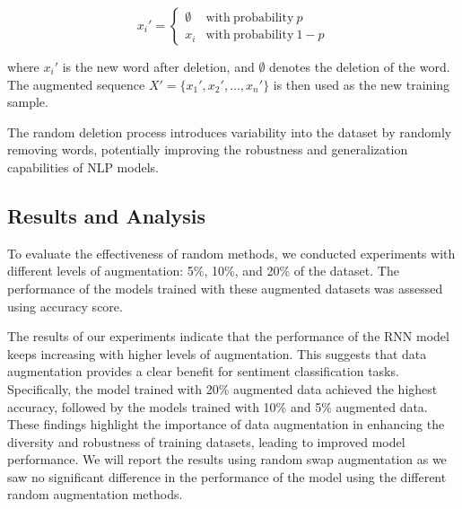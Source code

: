 \documentclass{article}
\begin{document}
\[
  x_i' =
  \begin{cases}
    \emptyset & \mathrm{with\ probability\ } p \\
    x_i & \mathrm{with\ probability\ } 1 - p
  \end{cases}
\]

where \( x_i' \) is the new word after deletion, and \( \emptyset \) denotes the deletion of the word. The augmented sequence \( X' = \{x_1', x_2', \ldots, x_n'\} \) is then used as the new training sample.

The random deletion process introduces variability into the dataset by randomly removing words, potentially improving the robustness and generalization capabilities of NLP models.


\subsection{Results and Analysis}

To evaluate the effectiveness of random methods, we conducted experiments
with different levels of augmentation: 5\%, 10\%, and 20\% of the dataset. The
performance of the models trained with these augmented datasets was assessed
using accuracy score.

The results of our experiments indicate that the performance of the RNN model
keeps increasing with higher levels of augmentation. This suggests that data
augmentation provides a clear benefit for sentiment classification tasks.
Specifically, the model trained with 20\% augmented data achieved the highest
accuracy, followed by the models trained with 10\% and 5\% augmented data.
These findings highlight the importance of data augmentation in enhancing the
diversity and robustness of training datasets, leading to improved model
performance. We will report the results using random swap augmentation as we saw
no significant difference in the performance of the model using the different
random augmentation methods.
\end{document}
